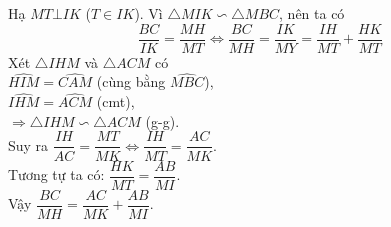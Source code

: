 \begin{ex}[9H0G1]
{		Hạ $MT \bot IK$ ($T\in IK$). Vì $\triangle MIK \backsim \triangle MBC$, nên ta có
		$$ \dfrac{BC}{IK}=\dfrac{MH}{MT} \Leftrightarrow \dfrac{BC}{MH}=\dfrac{IK}{MY}=\dfrac{IH}{MT}+\dfrac{HK}{MT}$$
		Xét $\triangle IHM $ và $\triangle ACM$ có\\
		$\widehat{HIM}=\widehat{CAM}$ (cùng bằng $\widehat{MBC}$),\\
		$\widehat{IHM}=\widehat{ACM}$ (cmt),\\
		$\Rightarrow \triangle IHM \backsim \triangle ACM$ (g-g).\\
		Suy ra $\dfrac{IH}{AC}=\dfrac{MT}{MK} \Leftrightarrow \dfrac{IH}{MT}=\dfrac{AC}{MK}$.\\ Tương tự ta có: $\dfrac{HK}{MT}=\dfrac{AB}{MI}$.\\
		Vậy $\dfrac{BC}{MH}=\dfrac{AC}{MK}+\dfrac{AB}{MI}$.
	}
\end{ex}
